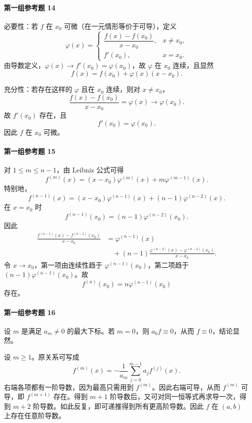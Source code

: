 \paragraph{第一组参考题 14}
\begin{xsolution}
必要性：若 $f$ 在 $x_0$ 可微（在一元情形等价于可导），定义
\[
  \varphi(x)=
  \begin{cases}
    \dfrac{f(x)-f(x_0)}{x-x_0},&x\ne x_0,\\[6pt]
    f'(x_0),&x=x_0.
  \end{cases}
\]
由导数定义，$\varphi(x)\to f'(x_0)=\varphi(x_0)$，故 $\varphi$ 在 $x_0$ 连续，且显然
\[
  f(x)=f(x_0)+\varphi(x)(x-x_0).
\]

充分性：若存在这样的 $\varphi$ 且在 $x_0$ 连续，则对 $x\ne x_0$，
\[
  \frac{f(x)-f(x_0)}{x-x_0}=\varphi(x)\to\varphi(x_0).
\]
故 $f'(x_0)$ 存在，且
\[
  f'(x_0)=\varphi(x_0).
\]
因此 $f$ 在 $x_0$ 可微。
\end{xsolution}

\paragraph{第一组参考题 15}
\begin{xsolution}
对 $1\le m\le n-1$，由 Leibniz 公式可得
\[
  f^{(m)}(x)=(x-x_0)\varphi^{(m)}(x)+m\varphi^{(m-1)}(x).
\]
特别地，
\[
  f^{(n-1)}(x)
  =(x-x_0)\varphi^{(n-1)}(x)+(n-1)\varphi^{(n-2)}(x).
\]
在 $x=x_0$ 时
\[
  f^{(n-1)}(x_0)=(n-1)\varphi^{(n-2)}(x_0).
\]
因此
\begin{align*}
  \frac{f^{(n-1)}(x)-f^{(n-1)}(x_0)}{x-x_0}
  &=\varphi^{(n-1)}(x)\\
  &\quad +(n-1)\frac{\varphi^{(n-2)}(x)-\varphi^{(n-2)}(x_0)}{x-x_0}.
\end{align*}
令 $x\to x_0$，第一项由连续性趋于 $\varphi^{(n-1)}(x_0)$，第二项趋于 $(n-1)\varphi^{(n-1)}(x_0)$。故
\[
  \boxed{f^{(n)}(x_0)=n\varphi^{(n-1)}(x_0)}
\]
存在。
\end{xsolution}

\paragraph{第一组参考题 16}
\begin{xsolution}
设 $m$ 是满足 $a_m\ne0$ 的最大下标。若 $m=0$，则 $a_0f\equiv0$，从而 $f\equiv0$，结论显然。

设 $m\ge1$。原关系可写成
\[
  f^{(m)}(x)=-\frac1{a_m}\sum_{j=0}^{m-1}a_jf^{(j)}(x).
\]
右端各项都有一阶导数，因为最高只需用到 $f^{(m)}$。因此右端可导，从而 $f^{(m)}$ 可导，即 $f^{(m+1)}$ 存在。得到 $m+1$ 阶导数后，又可对同一恒等式再求导一次，得到 $m+2$ 阶导数。如此反复，即可递推得到所有更高阶导数。因此 $f$ 在 $(a,b)$ 上存在任意阶导数。
\end{xsolution}

